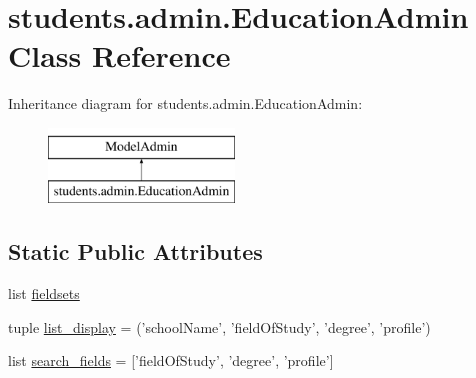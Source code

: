 \hypertarget{classstudents_1_1admin_1_1_education_admin}{\section{students.\-admin.\-Education\-Admin Class Reference}
\label{classstudents_1_1admin_1_1_education_admin}
}
Inheritance diagram for students.\-admin.\-Education\-Admin\-:\begin{figure}[H]
\begin{center}
\leavevmode
\includegraphics[height=2.000000cm]{classstudents_1_1admin_1_1_education_admin}
\end{center}
\end{figure}
\subsection*{Static Public Attributes}
\begin{DoxyCompactItemize}
\item 
list \hyperlink{classstudents_1_1admin_1_1_education_admin_a67e5ca4edffc907cb58002f86916faf4}{fieldsets}
\item 
tuple \hyperlink{classstudents_1_1admin_1_1_education_admin_a09f7b742c0a5a1e114576ae9529f8e51}{list\-\_\-display} = ('school\-Name', 'field\-Of\-Study', 'degree', 'profile')
\item 
list \hyperlink{classstudents_1_1admin_1_1_education_admin_a7240de856d0b49bae16a0e65804dcefa}{search\-\_\-fields} = \mbox{[}'field\-Of\-Study', 'degree', 'profile'\mbox{]}
\end{DoxyCompactItemize}


